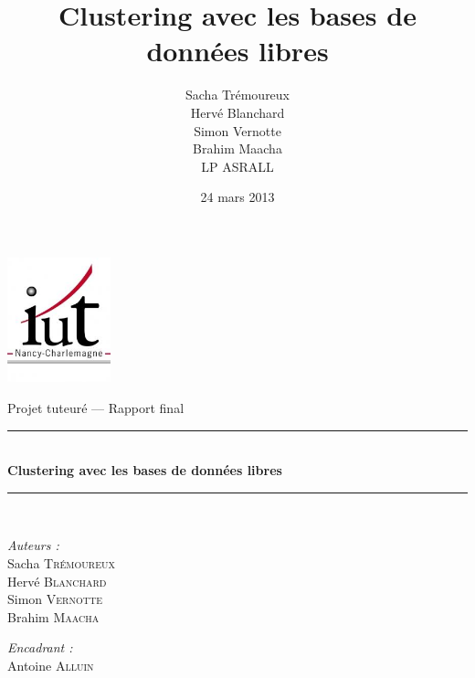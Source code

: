 \documentclass[12pt]{report}
\title{Clustering avec les bases de données libres}
\author{Sacha Trémoureux\\Hervé Blanchard\\Simon Vernotte\\Brahim Maacha\\LP ASRALL}
\date{24 mars 2013}
\newcommand{\HRule}{\rule{\linewidth}{0.5mm}}
\begin{document}
\renewcommand{\chaptername}{Partie}

\begin{titlepage}

  \begin{center}

    \begin{minipage}[t]{0.48\textwidth}
      \begin{center}
        \includegraphics [width=30mm]{./iut.jpg} \\[0.5cm]
        \begin{spacing}{1.5}
        \end{spacing}
      \end{center}
    \end{minipage}

    \LARGE{Projet tuteuré — Rapport final}\\[0.9cm]
    \HRule \\[0.6cm]
           {\huge \bfseries
             Clustering avec les bases de données libres
           }\\[0.3cm]
           \HRule \\[1.5cm]

           \begin{minipage}[t]{0.4\textwidth}
             \begin{flushleft} \large
               \emph{Auteurs :}\\[0.2cm]
               Sacha \textsc{Trémoureux}\\Hervé \textsc{Blanchard}\\Simon
               \textsc{Vernotte}\\Brahim \textsc{Maacha}
             \end{flushleft}
           \end{minipage}
           \begin{minipage}[t]{0.5\textwidth}
             \begin{flushright}
               \large
               \emph{Encadrant :} \\[0.2cm]
               Antoine
               \textsc{Alluin}
             \end{flushright}
           \end{minipage}\\[1cm]
           

\end{center}
\end{titlepage}
\end{document}
